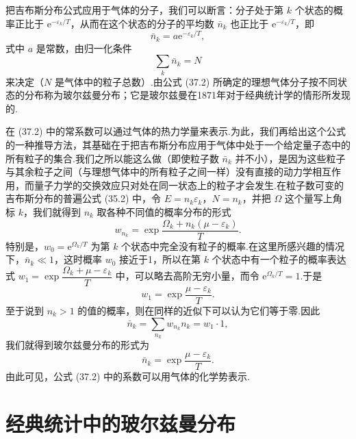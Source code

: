 把吉布斯分布公式应用于气体的分子，我们可以断言：分子处于第 $k$ 个状态的概率正比于 $\mathrm{e}^{-\varepsilon_k/T}$，从而在这个状态的分子的平均数 $\bar{n}_k$ 也正比于 $\mathrm{e}^{-\varepsilon_k/T}$，即
\begin{equation}
  \bar{n}_k=a\mathrm{e}^{-\varepsilon_k/T},
\end{equation}
式中 $a$ 是常数，由归一化条件
\begin{equation}
  \sum_k\bar{n}_k=N
\end{equation}
来决定（$N$ 是气体中的粒子总数）.由公式 (37.2) 所确定的理想气体分子按不同状态的分布称为玻尔兹曼分布；它是玻尔兹曼在1871年对于经典统计学的情形所发现的.

在 (37.2) 中的常系数可以通过气体的热力学量来表示.为此，我们再给出这个公式的一种推导方法，其基础在于把吉布斯分布应用于气体中处于一个给定量子态中的所有粒子的集合.我们之所以能这么做（即使粒子数 $\bar{n}_k$ 并不小），是因为这些粒子与其余粒子之间（与理想气体中的所有粒子之间一样）没有直接的动力学相互作用，而量子力学的交换效应只对处在同一状态上的粒子才会发生.在粒子数可变的吉布斯分布的普遍公式 (35.2) 中，令 $E=n_k\varepsilon_k$，$N=n_k$，并把 $\Omega$ 这个量写上角标 $k$，我们就得到 $n_k$ 取各种不同值的概率分布的形式
\begin{equation}
  w_{n_k}=\exp\frac{\Omega_k+n_k(\mu-\varepsilon_k)}{T}.
\end{equation}
特别是，$w_0=\mathrm{e}^{\Omega_k/T}$ 为第 $k$ 个状态中完全没有粒子的概率.在这里所感兴趣的情况下，$\bar{n}_k\ll1$，这时概率 $w_0$ 接近于1，所以在第 $k$ 个状态中有一个粒子的概率表达式 $w_1=\exp\dfrac{\Omega_k+\mu-\varepsilon_k}{T}$ 中，可以略去高阶无穷小量，而令 $\mathrm{e}^{\Omega_k/T}=1$.于是
\begin{equation*}
  w_1=\exp\frac{\mu-\varepsilon_k}{T}.
\end{equation*}
至于说到 $n_k>1$ 的值的概率，则在同样的近似下可以认为它们等于零.因此
\begin{equation*}
  \bar{n}_k=\sum_{n_k}w_{n_k}n_k=w_1\cdot1,
\end{equation*}
我们就得到玻尔兹曼分布的形式为
\begin{equation}
  \bar{n}_k=\exp\frac{\mu-\varepsilon_k}{T}.
\end{equation}
由此可见，公式 (37.2) 中的系数可以用气体的化学势表示.

\section{经典统计中的玻尔兹曼分布}

